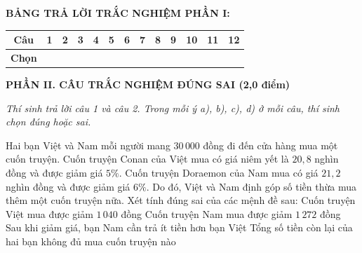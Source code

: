 \documentclass[12pt,a4paper]{article}
\begin{document}
\vspace{1mm}
\noindent\textbf{BẢNG TRẢ LỜI TRẮC NGHIỆM PHẦN I:}
\begin{center}
\begin{tabular}{|c|c|c|c|c|c|c|c|c|c|c|c|c|}
\hline
\textbf{Câu} & \textbf{1} & \textbf{2} & \textbf{3} & \textbf{4} & \textbf{5} & \textbf{6} & \textbf{7} & \textbf{8} & \textbf{9} & \textbf{10} & \textbf{11} & \textbf{12} \\
\hline
\textbf{Chọn} & \rule{0pt}{0.65cm} & & & & & & & & & & & \\
\hline
\end{tabular}
\end{center}
\vspace{2mm}

\setcounter{ex}{0}
\noindent\textbf{\large PHẦN II. CÂU TRẮC NGHIỆM ĐÚNG SAI (2,0 điểm)}

\textit{Thí sinh trả lời câu 1 và câu 2. Trong mỗi ý a), b), c), d) ở mỗi câu, thí sinh chọn đúng hoặc sai.}

\vspace{1mm}
\begin{ex}
\end{ex}

\begin{ex}
Hai bạn Việt và Nam mỗi người mang $30\,000$ đồng đi đến cửa hàng mua một cuốn truyện. Cuốn truyện Conan của Việt mua có giá niêm yết là $20{,}8$ nghìn đồng và được giảm giá $5\%$. Cuốn truyện Doraemon của Nam mua có giá $21{,}2$ nghìn đồng và được giảm giá $6\%$. Do đó, Việt và Nam định góp số tiền thừa mua thêm một cuốn truyện nữa. Xét tính đúng sai của các mệnh đề sau:
\choiceTF
{\True Cuốn truyện Việt mua được giảm $1\,040$ đồng}
{\True Cuốn truyện Nam mua được giảm $1\,272$ đồng}
{Sau khi giảm giá, bạn Nam cần trả ít tiền hơn bạn Việt}
{Tổng số tiền còn lại của hai bạn không đủ mua cuốn truyện nào}
\end{ex}
\end{document}
